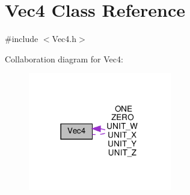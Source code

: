 \hypertarget{classVec4}{}\section{Vec4 Class Reference}
\label{classVec4}


{\ttfamily \#include $<$Vec4.\+h$>$}



Collaboration diagram for Vec4\+:
\nopagebreak
\begin{figure}[H]
\begin{center}
\leavevmode
\includegraphics[width=177pt]{classVec4__coll__graph}
\end{center}
\end{figure}
